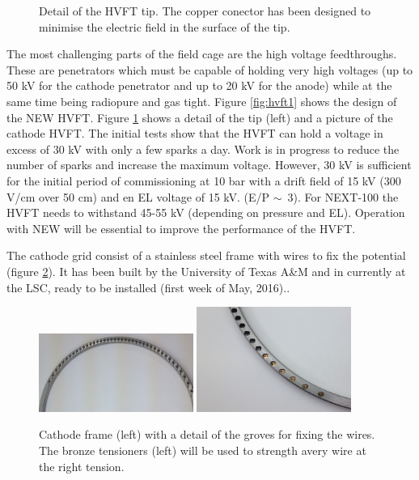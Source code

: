 \begin{figure}[hpt!]
\centering

\caption{Detail of the HVFT tip. The copper conector has been designed  to minimise the electric field in the surface of the tip.} \label{fig:hvft_tip}
\end{figure}


The most challenging parts of the field cage are the high voltage feedthroughs. These are penetrators which must be capable of holding very high voltages (up to 50 kV for the cathode penetrator and up to 20 kV for the anode) while at the same time being radiopure and gas tight. Figure \ref{fig:hvft1} shows the design of the NEW HVFT. Figure 
\ref{fig:hvft_tip} shows a detail of the tip (left) and a picture of the cathode HVFT. The initial tests show that the HVFT can hold a voltage in excess of 30 kV with only a few sparks a day. Work is in progress to reduce the number of sparks and increase the maximum voltage. However, 30 kV is sufficient for the initial period of commissioning at 10 bar with a drift field of 15 kV (300 V/cm over 50 cm) and en EL voltage of 15 kV. (E/P $\sim$~3). For NEXT-100 the HVFT needs to withstand 45-55 kV (depending on pressure and EL). Operation with NEW will be essential to improve the performance of the HVFT. 

The cathode grid consist of a stainless steel frame with wires to fix the potential (figure \ref{fig:cath}). It has
been built by the University of Texas A\&M and in currently at the LSC, ready to be installed (first week of May, 2016)..

\begin{figure}[hpt!]
\centering
\includegraphics[width=0.45\textwidth]{FieldCage/img/cathode_1.jpg}
\includegraphics[width=0.45\textwidth]{FieldCage/img/cathode_tensioners.jpg}
\caption{Cathode frame (left) with a detail of the groves for fixing the wires. The bronze tensioners (left) will be used to strength avery wire at the right tension.} \label{fig:cath}
\end{figure}

